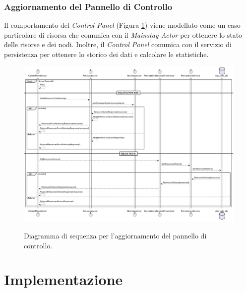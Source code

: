 \documentclass[12pt]{article}
\begin{document}
\subsubsection{Aggiornamento del Pannello di Controllo}

Il comportamento del \textit{Control Panel} (Figura \ref{fig:control-panel-sequence-diagram}) viene modellato come un caso particolare di risorsa che comunica con il \textit{Mainstay Actor} per ottenere lo stato delle risorse e dei nodi. Inoltre, il \textit{Control Panel} comunica con il servizio di persistenza per ottenere lo storico dei dati e calcolare le statistiche.

\begin{figure}[H]
    \caption{Diagramma di sequenza per l'aggiornamento del pannello di controllo.}
    \includegraphics[width=\textwidth]{../assets/images/control-panel-sequence-diagram.png}
    \label{fig:control-panel-sequence-diagram}
\end{figure}

\newpage


\section{Implementazione}\label{sec:implementazione}
\end{document}
